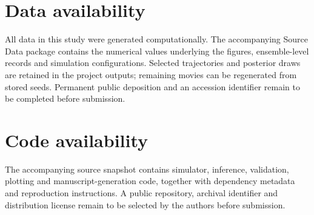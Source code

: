 \documentclass[12pt]{article}
\begin{document}
\section*{Data availability}
All data in this study were generated computationally. The accompanying Source Data package contains the numerical values underlying the figures, ensemble-level records and simulation configurations. Selected trajectories and posterior draws are retained in the project outputs; remaining movies can be regenerated from stored seeds. Permanent public deposition and an accession identifier remain to be completed before submission.

\section*{Code availability}
The accompanying source snapshot contains simulator, inference, validation, plotting and manuscript-generation code, together with dependency metadata and reproduction instructions. A public repository, archival identifier and distribution license remain to be selected by the authors before submission.
\end{document}
